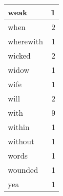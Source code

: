 \begin{center}
\begin{longtable}{l|r}
weak & 1 \\ \hline
when & 2 \\ \hline
wherewith & 1 \\ \hline
wicked & 2 \\ \hline
widow & 1 \\ \hline
wife & 1 \\ \hline
will & 2 \\ \hline
with & 9 \\ \hline
within & 1 \\ \hline
without & 1 \\ \hline
words & 1 \\ \hline
wounded & 1 \\ \hline
yea & 1 \\ \hline
\end{longtable}
\end{center}



\normalsize



